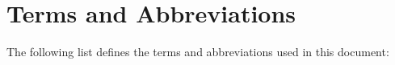 %
%
%
\chapter{Terms and Abbreviations}

\label{sec:terms}
The following list defines the terms and abbreviations used in this 
document:
